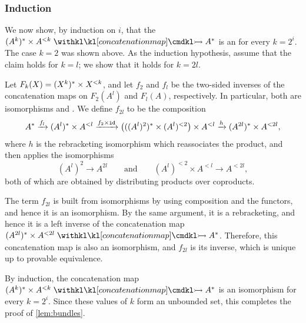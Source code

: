 \subsubsection{Induction}
\label{sec:bundle-induction}

We now show, by induction on $i$, that the  $\bundle[A]{k} \concmap A^*$ is an  for every $k = 2^i$. The case $k = 2$ was shown above. As the induction hypothesis, assume that the claim holds for $k = l$; we show that it holds for $k = 2l$.

Let $F_k(X) = \bundle[X]{k}$, and let $f_2$ and $f_l$ be the two-sided inverses of the concatenation maps on $F_2(A^l)$ and $F_l(A)$, respectively. In particular, both are isomorphisms and . We define $f_{2l}$ to be the composition
\[
    A^*
    \xrightarrow{f_l}
    (A^l)^* \times A^{<l}
    \xrightarrow{f_2 \times \idterm}
    \big(((A^l)^2)^* \times (A^l)^{<2}\big) \times A^{<l}
    \xrightarrow{h}
    (A^{2l})^* \times A^{<2l},
\]
where $h$ is the rebracketing isomorphism which reassociates the product, and then applies the isomorphisms
\[
    (A^l)^2 \to A^{2l}
    \qquad \text{and} \qquad
    (A^l)^{<2} \times A^{<l} \to A^{<2l},
\]
both of which are obtained by distributing products over coproducts.

The term $f_{2l}$ is built from isomorphisms by using composition and the functors, and hence it is an isomorphism. By the same argument, it is a rebracketing, and hence it is a left inverse of the concatenation map $\bundle[A]{2l} \concmap A^*$. Therefore, this concatenation map is also an isomorphism, and $f_{2l}$ is its inverse, which is unique up to provable equivalence.

By induction, the concatenation map $\bundle[A]{k} \concmap A^*$ is an isomorphism for every $k = 2^i$. Since these values of $k$ form an unbounded set, this completes the proof of \cref{lem:bundles}.

